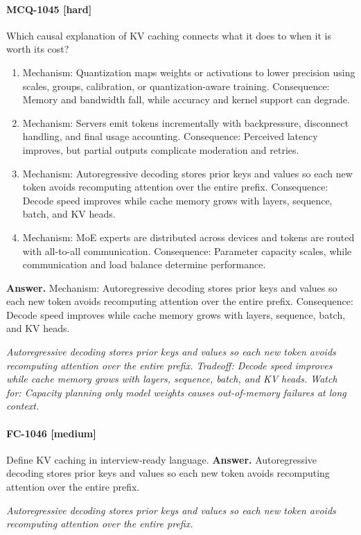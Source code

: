 \paragraph{MCQ-1045 [hard]} Which causal explanation of KV caching connects what it does to when it is worth its cost?
\begin{enumerate}[label=\Alph*.]
\item Mechanism: Quantization maps weights or activations to lower precision using scales, groups, calibration, or quantization-aware training. Consequence: Memory and bandwidth fall, while accuracy and kernel support can degrade.
\item Mechanism: Servers emit tokens incrementally with backpressure, disconnect handling, and final usage accounting. Consequence: Perceived latency improves, but partial outputs complicate moderation and retries.
\item Mechanism: Autoregressive decoding stores prior keys and values so each new token avoids recomputing attention over the entire prefix. Consequence: Decode speed improves while cache memory grows with layers, sequence, batch, and KV heads.
\item Mechanism: MoE experts are distributed across devices and tokens are routed with all-to-all communication. Consequence: Parameter capacity scales, while communication and load balance determine performance.
\end{enumerate}
\noindent\textbf{Answer.} Mechanism: Autoregressive decoding stores prior keys and values so each new token avoids recomputing attention over the entire prefix. Consequence: Decode speed improves while cache memory grows with layers, sequence, batch, and KV heads.
\par\textit{Autoregressive decoding stores prior keys and values so each new token avoids recomputing attention over the entire prefix. Tradeoff: Decode speed improves while cache memory grows with layers, sequence, batch, and KV heads. Watch for: Capacity planning only model weights causes out-of-memory failures at long context.}
\paragraph{FC-1046 [medium]} Define KV caching in interview-ready language.
\noindent\textbf{Answer.} Autoregressive decoding stores prior keys and values so each new token avoids recomputing attention over the entire prefix.
\par\textit{Autoregressive decoding stores prior keys and values so each new token avoids recomputing attention over the entire prefix.}
